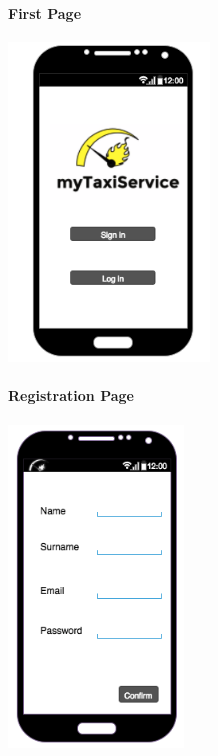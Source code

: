 		\paragraph{First Page}
		\begin{center}
		    \includegraphics[width=0.40\textwidth]{./images/TELEFONO1}
		\end{center}
		\paragraph{Registration Page}
		\begin{center}
		    \includegraphics[width=0.35\textwidth]{./images/TELEFONO2}
		\end{center}
